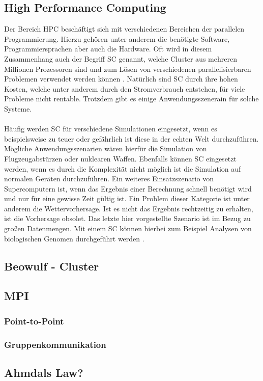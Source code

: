 \subsection{High Performance Computing}
Der Bereich \ac{HPC} beschäftigt sich mit verschiedenen Bereichen der parallelen Programmierung. Hierzu gehören unter anderem die benötigte Software, Programmiersprachen aber auch die Hardware. Oft wird in diesem Zusammenhang auch der Begriff \ac{SC} genannt, welche Cluster aus mehreren Millionen Prozessoren sind und zum Lösen von verschiedenen parallelisierbaren Problemen verwendet werden können \cite{nielsen2016introduction}. Natürlich sind \ac{SC} durch ihre hohen Kosten, welche unter anderem durch den Stromverbrauch entstehen, für viele Probleme nicht rentable. Trotzdem gibt es einige Anwendungsszenerain für solche Systeme.
\\\\
Häufig werden \ac{SC} für verschiedene Simulationen eingesetzt, wenn es beispielsweise zu teuer oder gefährlich ist diese in der echten Welt durchzuführen. Mögliche Anwendungsszenarien wären hierfür die Simulation von Flugzeugabstürzen oder nuklearen Waffen. Ebenfalls können \ac{SC} eingesetzt werden, wenn es durch die Komplexität nicht möglich ist die Simulation auf normalen Geräten durchzuführen. Ein weiteres Einsatzszenario von Supercomputern ist, wenn das Ergebnis einer Berechnung schnell benötigt wird und nur für eine gewisse Zeit gültig ist. Ein Problem dieser Kategorie ist unter anderem die Wettervorhersage. Ist es nicht das Ergebnis rechtzeitig zu erhalten, ist die Vorhersage obsolet. Das letzte hier vorgestellte Szenario ist im Bezug zu großen Datenmengen. Mit einem \ac{SC} können hierbei zum Beispiel Analysen von biologischen Genomen durchgeführt werden \cite{nielsen2016introduction}.


\subsection{Beowulf - Cluster}




\subsection{MPI}
\subsubsection{Point-to-Point}

\subsubsection{Gruppenkommunikation}



\subsection{Ahmdals Law?}


